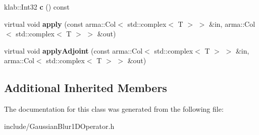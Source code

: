 \begin{DoxyCompactItemize}
\item 
klab\+::\+Int32 {\bfseries c} () const \hypertarget{classkl1p_1_1TGaussianBlur1DOperator_3_01std_1_1complex_3_01T_01_4_01_4_a0fd1f8d7fe4f0bf58f111c59b594ef83}{}\label{classkl1p_1_1TGaussianBlur1DOperator_3_01std_1_1complex_3_01T_01_4_01_4_a0fd1f8d7fe4f0bf58f111c59b594ef83}

\item 
virtual void {\bfseries apply} (const arma\+::\+Col$<$ std\+::complex$<$ T $>$ $>$ \&in, arma\+::\+Col$<$ std\+::complex$<$ T $>$ $>$ \&out)\hypertarget{classkl1p_1_1TGaussianBlur1DOperator_3_01std_1_1complex_3_01T_01_4_01_4_a00ec47be955735371b27301529dd7f29}{}\label{classkl1p_1_1TGaussianBlur1DOperator_3_01std_1_1complex_3_01T_01_4_01_4_a00ec47be955735371b27301529dd7f29}

\item 
virtual void {\bfseries apply\+Adjoint} (const arma\+::\+Col$<$ std\+::complex$<$ T $>$ $>$ \&in, arma\+::\+Col$<$ std\+::complex$<$ T $>$ $>$ \&out)\hypertarget{classkl1p_1_1TGaussianBlur1DOperator_3_01std_1_1complex_3_01T_01_4_01_4_a1e2868cf66b78473da6482ae1202d1fb}{}\label{classkl1p_1_1TGaussianBlur1DOperator_3_01std_1_1complex_3_01T_01_4_01_4_a1e2868cf66b78473da6482ae1202d1fb}

\end{DoxyCompactItemize}
\subsection*{Additional Inherited Members}


The documentation for this class was generated from the following file\+:\begin{DoxyCompactItemize}
\item 
include/Gaussian\+Blur1\+D\+Operator.\+h\end{DoxyCompactItemize}
